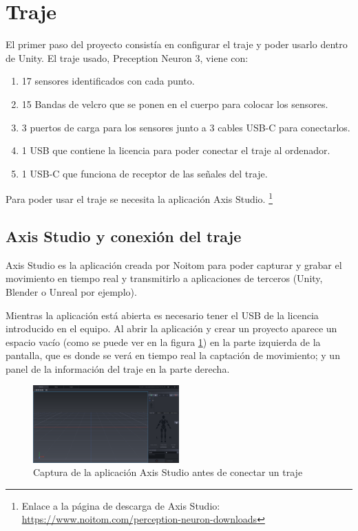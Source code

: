 \section{Traje}
\label{sec:traje}

El primer paso del proyecto consistía en configurar el traje y poder usarlo dentro de Unity.
El traje usado, Preception Neuron 3, viene con:

\begin{enumerate}
    \renewcommand{\theenumi}{\alph{enumi}}
    \item 17 sensores identificados con cada punto.
    \item 15 Bandas de velcro que se ponen en el cuerpo para colocar los sensores.
    \item 3 puertos de carga para los sensores junto a 3 cables USB-C para conectarlos.
    \item 1 USB que contiene la licencia para poder conectar el traje al ordenador.
    \item 1 USB-C que funciona de receptor de las señales del traje.
\end{enumerate}

Para poder usar el traje se necesita la aplicación Axis Studio. \footnote{Enlace a la página de descarga de Axis Studio: \url{https://www.noitom.com/perception-neuron-downloads}}
\subsection{Axis Studio y conexión del traje}
Axis Studio es la aplicación creada por Noitom para poder capturar y grabar el movimiento en tiempo real y transmitirlo a aplicaciones de terceros (Unity, Blender o Unreal por ejemplo).

Mientras la aplicación está abierta es necesario tener el USB de la licencia introducido en el equipo.
Al abrir la aplicación y crear un proyecto aparece un espacio vacío (como se puede ver en la figura \ref{fig:AxisSinTraje}) en la parte izquierda de la pantalla, que es donde se verá en tiempo real la captación de movimiento; y un panel de la información del traje en la parte derecha.

\begin{figure}[H]
	\centering
	\includegraphics[width=0.5\textwidth]{Imagenes/Bitmap/AxisSinTraje.PNG}
	\caption{Captura de la aplicación Axis Studio antes de conectar un traje}
	\label{fig:AxisSinTraje}
\end{figure}


